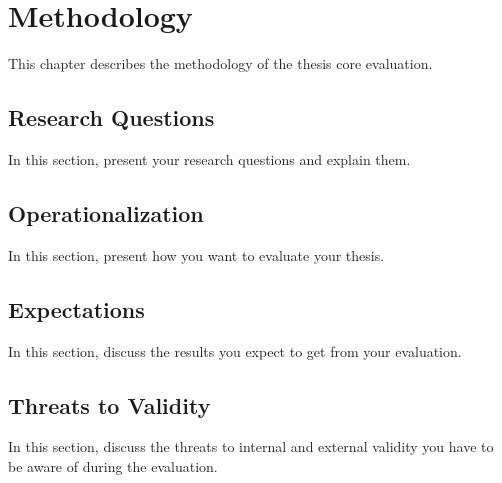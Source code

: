 \section*{Methodology}\label{ch:methodology}

This chapter describes the methodology of the thesis core evaluation.

\subsection*{Research Questions}\label{sec:research_questions}

In this section, present your research questions and explain them.

\subsection*{Operationalization}\label{sec:operationalization}

In this section, present how you want to evaluate your thesis.

\subsection*{Expectations}\label{sec:expectations}

In this section, discuss the results you expect to get from your evaluation.

\subsection*{Threats to Validity}\label{sec:threats}

In this section, discuss the threats to internal and external validity you have to be aware of during the evaluation.
